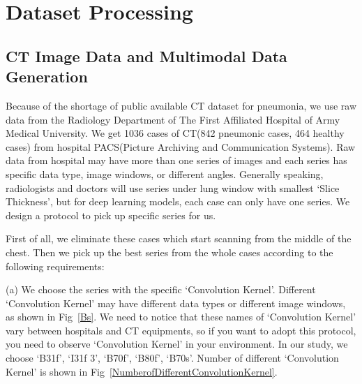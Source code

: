 \documentclass[journal]{IEEEtran}
\begin{document}
\section{Dataset Processing}
\label{datasetprocessing}
\subsection{CT Image Data and Multimodal Data Generation}
\label{ctimagedata}
Because of the shortage of public available CT dataset for pneumonia, we use raw data from the Radiology Department of The First Affiliated Hospital of Army Medical University. We get 1036 cases of CT(842 pneumonic cases, 464 healthy cases) from hospital PACS(Picture Archiving and Communication Systems). Raw data from hospital may have more than one series of images and each series has specific data type, image windows, or different angles. 
Generally speaking, radiologists and doctors will use series under lung window with smallest `Slice Thickness', but for deep learning models, each case can only have one series. We design a protocol to pick up specific series for us.

First of all, we eliminate these cases which start scanning from the middle of the chest. Then we pick up the best series from the whole cases according to the following requirements:

(a) We choose the series with the specific `Convolution Kernel'. Different `Convolution Kernel' may have different data types or different image windows, as shown in Fig~\ref{Bs}. We need to notice that these names of `Convolution Kernel' vary between hospitals and CT equipments, so if you want to adopt this protocol, you need to observe `Convolution Kernel' in your environment. In our study, we choose `B31f', `I31f 3', `B70f', `B80f', `B70s'. Number of different `Convolution Kernel' is shown in Fig~\ref{NumberofDifferentConvolutionKernel}. 
\end{document}
